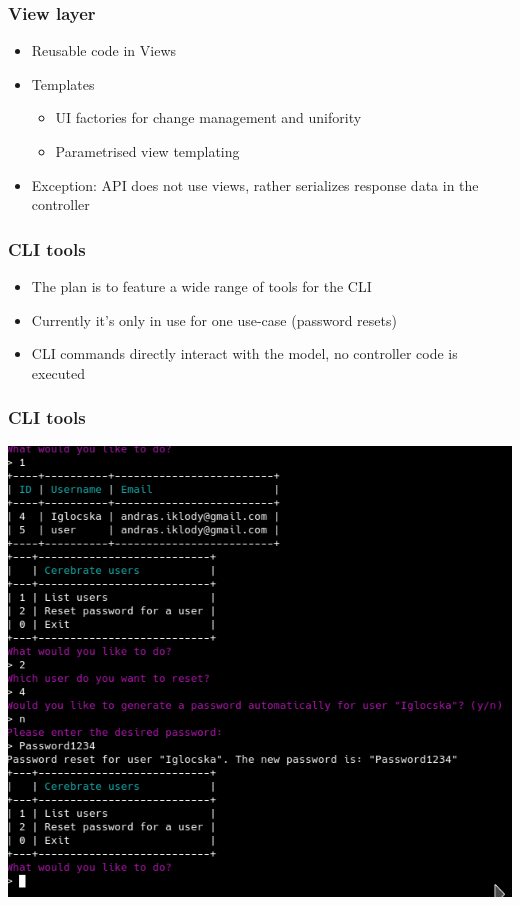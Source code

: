 \begin{frame}
	\frametitle{View layer}
	\begin{itemize}
		\item Reusable code in Views
                \item Templates
                \begin{itemize}
                    \item UI factories for change management and unifority
                    \item Parametrised view templating
                \end{itemize}
                \item Exception: API does not use views, rather serializes response data in the controller
	\end{itemize}
\end{frame}

\begin{frame}
	\frametitle{CLI tools}
	\begin{itemize}
		\item The plan is to feature a wide range of tools for the CLI
                \item Currently it's only in use for one use-case (password resets)
                \item CLI commands directly interact with the model, no controller code is executed
	\end{itemize}
\end{frame}

\begin{frame}
\frametitle{CLI tools}
\begin{center}
    \includegraphics[scale=0.5]{CLI.png}
\end{center}
\end{frame}

